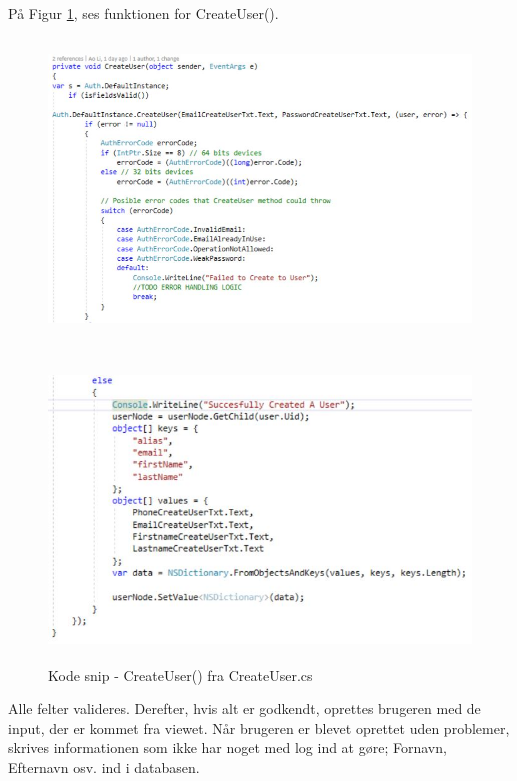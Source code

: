 På Figur \ref{fig:CreateUser}, ses funktionen for CreateUser().
\begin{figure}[H] %
	\centering
	\includegraphics[height=8cm, width=17cm]{../ArkitekturDesign/Design/OpretBruger/CreateUser1}
\end{figure}
\begin{figure}[H] %
	\centering
	\includegraphics[height=8cm, width=17cm]{../ArkitekturDesign/Design/OpretBruger/CreateUser2}
	\caption{Kode snip - CreateUser() fra CreateUser.cs}
	\label{fig:CreateUser}
\end{figure}
Alle felter valideres. Derefter, hvis alt er godkendt, oprettes brugeren med de input, der er kommet fra viewet. Når brugeren er blevet oprettet uden problemer, skrives informationen som ikke har noget med log ind at gøre; Fornavn, Efternavn osv. ind i databasen.

\clearpage